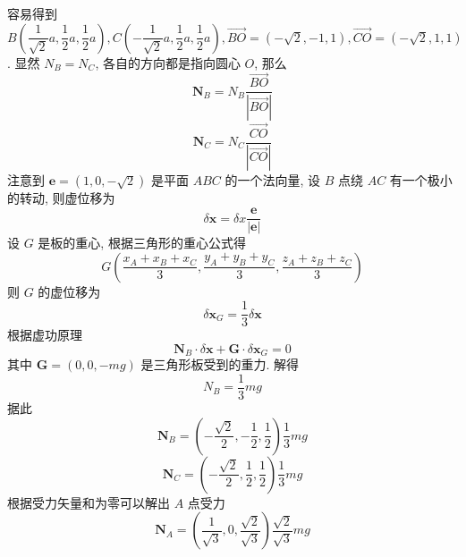 \documentclass[12pt,a4paper]{article}
\begin{document}
	容易得到 $B\left(\dfrac{1}{\sqrt{2}}a,\dfrac{1}{2}a,\dfrac{1}{2}a\right),C\left(-\dfrac{1}{\sqrt{2}}a,\dfrac{1}{2}a,\dfrac{1}{2}a\right),\overrightarrow{BO}=\left( -\sqrt{2},-1,1 \right),\overrightarrow{CO}=\left( -\sqrt{2},1,1 \right)$. 显然 $N_B=N_C$, 各自的方向都是指向圆心 $O$, 那么
	\begin{equation}
		\boldsymbol{N}_B=N_B\dfrac{\overrightarrow{BO}}{|\overrightarrow{BO}|}
	\end{equation}
	\begin{equation}
		\boldsymbol{N}_C=N_C\dfrac{\overrightarrow{CO}}{|\overrightarrow{CO}|}
	\end{equation}
	注意到 $\boldsymbol{e}=\left( 1,0,-\sqrt{2} \right) $ 是平面 $ABC$ 的一个法向量, 设 $B$ 点绕 $AC$ 有一个极小的转动, 则虚位移为
	\begin{equation}
		\delta \boldsymbol{x}=\delta x\dfrac{\boldsymbol{e}}{|\boldsymbol{e}|}
	\end{equation}
	设 $G$ 是板的重心, 根据三角形的重心公式得
	\begin{equation}
		G\left( \dfrac{x_A+x_B+x_C}{3},\dfrac{y_A+y_B+y_C}{3},\dfrac{z_A+z_B+z_C}{3}\right) 
	\end{equation}
	则 $G$ 的虚位移为
	\begin{equation}
		\delta\boldsymbol{x}_G=\dfrac{1}{3}\delta\boldsymbol{x}
	\end{equation}
	根据虚功原理
	\begin{equation}
		\boldsymbol{N}_B\cdot\delta \boldsymbol{x}+\boldsymbol{G}\cdot\delta\boldsymbol{x}_G=0
	\end{equation}
	其中 $\boldsymbol{G}=\left(0,0,-mg \right) $ 是三角形板受到的重力.
	解得
	$$
	N_B=\dfrac{1}{3}mg
	$$
	据此
	$$
	\boldsymbol{N}_B=\left( -\dfrac{\sqrt{2}}{2},-\dfrac{1}{2},\dfrac{1}{2}\right) \dfrac{1}{3}mg
	$$
	$$
	\boldsymbol{N}_C=\left( -\dfrac{\sqrt{2}}{2},\dfrac{1}{2},\dfrac{1}{2}\right) \dfrac{1}{3}mg
	$$ 
	根据受力矢量和为零可以解出 $A$ 点受力
	$$
	\boldsymbol{N}_A=\left( \dfrac{1}{\sqrt{3}},0,\dfrac{\sqrt{2}}{\sqrt{3}}\right) \dfrac{\sqrt{2}}{\sqrt{3}}mg
	$$
\end{document}
